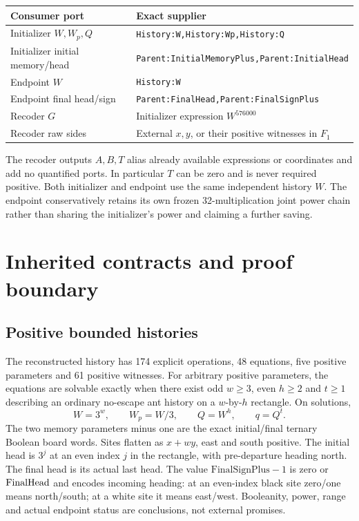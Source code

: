 \documentclass[11pt,letterpaper]{article}
\theoremstyle{definition}\newtheorem{definition}[theorem]{Definition}
\theoremstyle{remark}\newtheorem{remark}[theorem]{Remark}
\newcommand{\codeu}[1]{\nolinkurl{#1}}
\newcommand{\FS}{\mathrm{FinalSignPlus}}
\begin{document}
\begin{center}\small
\begin{tabular}{@{}ll@{}}\toprule
Consumer port & Exact supplier\\\midrule
Initializer $W,W_p,Q$ & \codeu{History:W,History:Wp,History:Q}\\
Initializer initial memory/head & \codeu{Parent:InitialMemoryPlus,Parent:InitialHead}\\
Endpoint $W$ & \codeu{History:W}\\
Endpoint final head/sign & \codeu{Parent:FinalHead,Parent:FinalSignPlus}\\
Recoder $G$ & Initializer expression $W^{576000}$\\
Recoder raw sides & External $x,y$, or their positive witnesses in $F_1$\\\bottomrule
\end{tabular}\end{center}
The recoder outputs $A,B,T$ alias already available expressions or coordinates and add no quantified ports. In particular $T$ can be zero and is never required positive. Both initializer and endpoint use the same independent history $W$. The endpoint conservatively retains its own frozen 32-multiplication joint power chain rather than sharing the initializer's power and claiming a further saving.

\section{Inherited contracts and proof boundary}\label{ptr:pc:sec:dependencies}
\subsection{Positive bounded histories}
The reconstructed history has 174 explicit operations, 48 equations, five positive parameters and 61 positive witnesses. For arbitrary positive parameters, the equations are solvable exactly when there exist odd $w\ge3$, even $h\ge2$ and $t\ge1$ describing an ordinary no-escape ant history on a $w$-by-$h$ rectangle. On solutions,
\begin{equation}\label{ptr:pc:eq:geometry}
 W=3^w,\qquad W_p=W/3,\qquad Q=W^h,\qquad q=Q^t.
\end{equation}
The two memory parameters minus one are the exact initial/final ternary Boolean board words. Sites flatten as $x+wy$, east and south positive. The initial head is $3^j$ at an even index $j$ in the rectangle, with pre-departure heading north. The final head is its actual last head. The value $\FS-1$ is zero or $\mathrm{FinalHead}$ and encodes incoming heading: at an even-index black site zero/one means north/south; at a white site it means east/west. Booleanity, power, range and actual endpoint status are conclusions, not external promises.
\end{document}
